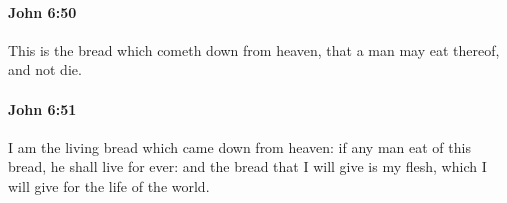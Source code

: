 		\paragraph{John 6:50} %
			\label{JOHN-6-50}

			This is the bread which cometh down from heaven, that a man may eat thereof, and not die.

			\begin{framed}
			\scriptsize
				\begin{compactdesc}
					\item[SBLG] 
				\end{compactdesc}
			\end{framed}

		\paragraph{John 6:51} %
			\label{JOHN-6-51}

			I am the living bread which came down from heaven: if any man eat of this bread, he shall live for ever: and the bread that I will give is my flesh, which I will give for the life of the world.

